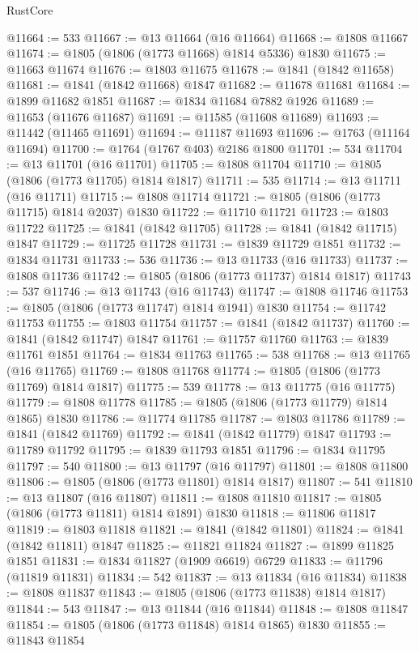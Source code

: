 \begin{lexlean}{RustCore}
\begin{coremodule}
@11664 := 533
@11667 := @13 @11664 (@16 @11664)
@11668 := @1808 @11667
@11674 := @1805 (@1806 (@1773 @11668) @1814 @5336) @1830
@11675 := @11663 @11674
@11676 := @1803 @11675
@11678 := @1841 (@1842 @11658)
@11681 := @1841 (@1842 @11668) @1847
@11682 := @11678 @11681
@11684 := @1899 @11682 @1851
@11687 := @1834 @11684 @7882 @1926
@11689 := @11653 (@11676 @11687)
@11691 := @11585 (@11608 @11689)
@11693 := @11442 (@11465 @11691)
@11694 := @11187 @11693
@11696 := @1763 (@11164 @11694)
@11700 := @1764 (@1767 @403) @2186 @1800
@11701 := 534
@11704 := @13 @11701 (@16 @11701)
@11705 := @1808 @11704
@11710 := @1805 (@1806 (@1773 @11705) @1814 @1817)
@11711 := 535
@11714 := @13 @11711 (@16 @11711)
@11715 := @1808 @11714
@11721 := @1805 (@1806 (@1773 @11715) @1814 @2037) @1830
@11722 := @11710 @11721
@11723 := @1803 @11722
@11725 := @1841 (@1842 @11705)
@11728 := @1841 (@1842 @11715) @1847
@11729 := @11725 @11728
@11731 := @1839 @11729 @1851
@11732 := @1834 @11731
@11733 := 536
@11736 := @13 @11733 (@16 @11733)
@11737 := @1808 @11736
@11742 := @1805 (@1806 (@1773 @11737) @1814 @1817)
@11743 := 537
@11746 := @13 @11743 (@16 @11743)
@11747 := @1808 @11746
@11753 := @1805 (@1806 (@1773 @11747) @1814 @1941) @1830
@11754 := @11742 @11753
@11755 := @1803 @11754
@11757 := @1841 (@1842 @11737)
@11760 := @1841 (@1842 @11747) @1847
@11761 := @11757 @11760
@11763 := @1839 @11761 @1851
@11764 := @1834 @11763
@11765 := 538
@11768 := @13 @11765 (@16 @11765)
@11769 := @1808 @11768
@11774 := @1805 (@1806 (@1773 @11769) @1814 @1817)
@11775 := 539
@11778 := @13 @11775 (@16 @11775)
@11779 := @1808 @11778
@11785 := @1805 (@1806 (@1773 @11779) @1814 @1865) @1830
@11786 := @11774 @11785
@11787 := @1803 @11786
@11789 := @1841 (@1842 @11769)
@11792 := @1841 (@1842 @11779) @1847
@11793 := @11789 @11792
@11795 := @1839 @11793 @1851
@11796 := @1834 @11795
@11797 := 540
@11800 := @13 @11797 (@16 @11797)
@11801 := @1808 @11800
@11806 := @1805 (@1806 (@1773 @11801) @1814 @1817)
@11807 := 541
@11810 := @13 @11807 (@16 @11807)
@11811 := @1808 @11810
@11817 := @1805 (@1806 (@1773 @11811) @1814 @1891) @1830
@11818 := @11806 @11817
@11819 := @1803 @11818
@11821 := @1841 (@1842 @11801)
@11824 := @1841 (@1842 @11811) @1847
@11825 := @11821 @11824
@11827 := @1899 @11825 @1851
@11831 := @1834 @11827 (@1909 @6619) @6729
@11833 := @11796 (@11819 @11831)
@11834 := 542
@11837 := @13 @11834 (@16 @11834)
@11838 := @1808 @11837
@11843 := @1805 (@1806 (@1773 @11838) @1814 @1817)
@11844 := 543
@11847 := @13 @11844 (@16 @11844)
@11848 := @1808 @11847
@11854 := @1805 (@1806 (@1773 @11848) @1814 @1865) @1830
@11855 := @11843 @11854

\end{coremodule}
\end{lexlean}
